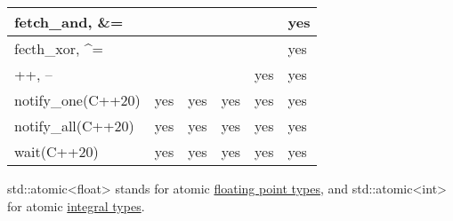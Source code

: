 \begin{longtable}[c]{|l|l|l|l|l|l|}
fetch\_and, \&=                                          &     &     &     &     & yes \\ \hline
fecth\_xor, \textasciicircum{}=                          &     &     &     &     & yes \\ \hline
++, --                                                   &     &     &     & yes & yes \\ \hline
notify\_one(C++20)                                       & yes & yes & yes & yes & yes \\ \hline
notify\_all(C++20)                                       & yes & yes & yes & yes & yes \\ \hline
wait(C++20)                                              & yes & yes & yes & yes & yes \\ \hline
\end{longtable}

std::atomic<float> stands for atomic \href{https://en.cppreference.com/w/cpp/types/is_floating_point}{floating point types}, and std::atomic<int> for atomic \href{https://en.cppreference.com/w/cpp/types/is_integral}{integral types}.













